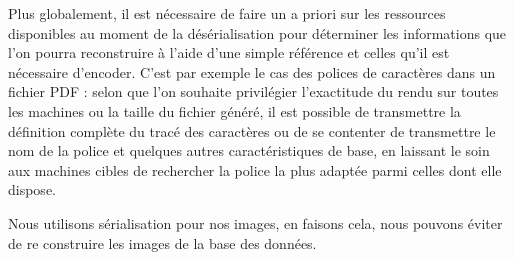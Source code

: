 Plus globalement, il est nécessaire de faire un a priori sur les ressources disponibles au moment de la désérialisation pour déterminer les informations que l'on pourra reconstruire à l'aide d'une simple référence et celles qu'il est nécessaire d'encoder. C'est par exemple le cas des polices de caractères dans un fichier PDF : selon que l'on souhaite privilégier l'exactitude du rendu sur toutes les machines ou la taille du fichier généré, il est possible de transmettre la définition complète du tracé des caractères ou de se contenter de transmettre le nom de la police et quelques autres caractéristiques de base, en laissant le soin aux machines cibles de rechercher la police la plus adaptée parmi celles dont elle dispose.

Nous utilisons sérialisation pour nos images, en faisons cela, nous pouvons éviter de re construire les images de la base des données.




